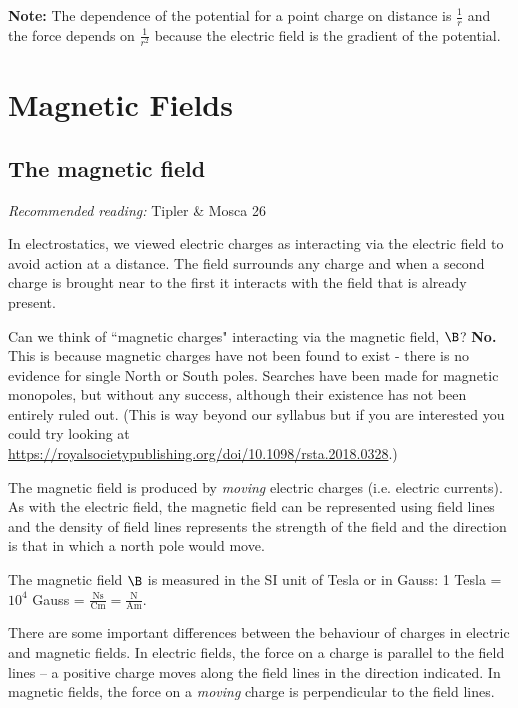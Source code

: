 \documentclass[
]{book}
\begin{document}
\textbf{Note:} The dependence of the potential for a point charge on distance
is \(\frac{1}{r}\) and the force depends on \(\frac{1}{r^2}\) because the
electric field is the gradient of the potential.

\hypertarget{magnetic-fields}{%
\chapter{Magnetic Fields}\label{magnetic-fields}}

\hypertarget{the-magnetic-field}{%
\section{The magnetic field}\label{the-magnetic-field}}

\emph{Recommended reading:} Tipler \& Mosca 26

In electrostatics, we viewed electric charges as interacting via the
electric field to avoid action at a distance. The field surrounds any
charge and when a second charge is brought near to the first it
interacts with the field that is already present.

Can we think of ``magnetic charges" interacting via the magnetic field,
\(\B\)? \textbf{No.} This is because magnetic charges have not been found to
exist - there is no evidence for single North or South poles. Searches
have been made for magnetic monopoles, but without any success, although
their existence has not been entirely ruled out. (This is way beyond our
syllabus but if you are interested you could try looking at
\url{https://royalsocietypublishing.org/doi/10.1098/rsta.2018.0328}.)

The magnetic field is produced by \emph{moving} electric charges (i.e.
electric currents). As with the electric field, the magnetic field can
be represented using field lines and the density of field lines
represents the strength of the field and the direction is that in which
a north pole would move.

The magnetic field \(\B\) is measured in the SI unit of Tesla or in Gauss:
1 Tesla = \(10^4\) Gauss =
\(\frac{\mathrm{Ns}}{\mathrm{Cm}} = \frac{\mathrm{N}}{\mathrm{Am}}\).

There are some important differences between the behaviour of charges in
electric and magnetic fields. In electric fields, the force on a charge
is parallel to the field lines -- a positive charge moves along the
field lines in the direction indicated. In magnetic fields, the force on
a \emph{moving} charge is perpendicular to the field lines.
\end{document}
